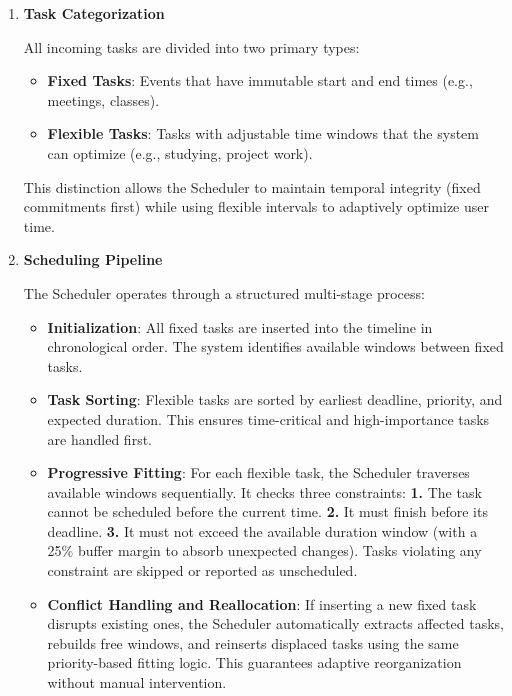 \documentclass[12pt, a4paper]{article}
\begin{document}
            \begin{enumerate}
                \item \textbf{Task Categorization}

                    All incoming tasks are divided into two primary types: 

                    \begin{itemize}
                        \item \textbf{Fixed Tasks}: Events that have immutable start and end times (e.g., meetings, classes).
                        \item \textbf{Flexible Tasks}: Tasks with adjustable time windows that the system can optimize (e.g., studying, project work).
                    \end{itemize}

                    This distinction allows the Scheduler to maintain temporal integrity (fixed commitments first) while using flexible intervals to adaptively optimize user time.

                \item \textbf{Scheduling Pipeline}

                    The Scheduler operates through a structured multi-stage process:

                    \begin{itemize}
                        \item \textbf{Initialization}: All fixed tasks are inserted into the timeline in chronological order. The system identifies available windows between fixed tasks. 
                        \item \textbf{Task Sorting}: Flexible tasks are sorted by earliest deadline, priority, and expected duration. This ensures time-critical and high-importance tasks are handled first.
                        \item \textbf{Progressive Fitting}: For each flexible task, the Scheduler traverses available windows sequentially. It checks three constraints: \textbf{1.} The task cannot be scheduled before the current time. \textbf{2.} It must finish before its deadline. \textbf{3.} It must not exceed the available duration window (with a 25\% buffer margin to absorb unexpected changes). Tasks violating any constraint are skipped or reported as unscheduled.
                        \item \textbf{Conflict Handling and Reallocation}: If inserting a new fixed task disrupts existing ones, the Scheduler automatically extracts affected tasks, rebuilds free windows, and reinserts displaced tasks using the same priority-based fitting logic. This guarantees adaptive reorganization without manual intervention.
                    \end{itemize}
            \end{enumerate}
\end{document}
